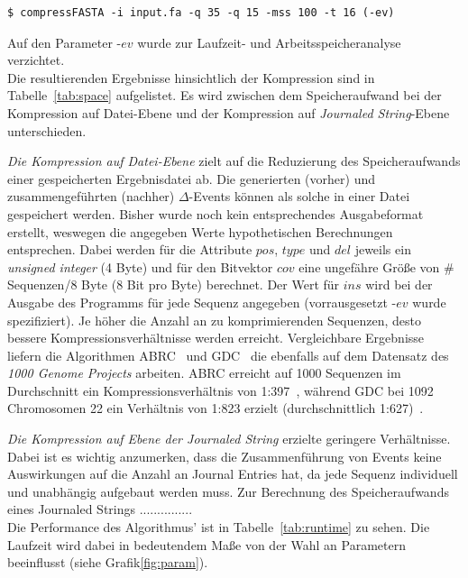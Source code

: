 \documentclass[12pt]{article}
\begin{document}
\begin{lstlisting}[style=BashInputStyle]
    $ compressFASTA -i input.fa -q 35 -q 15 -mss 100 -t 16 (-ev)
\end{lstlisting}

Auf den Parameter -$ev$ wurde zur Laufzeit- und Arbeitsspeicheranalyse verzichtet.\\

\noindent Die resultierenden Ergebnisse hinsichtlich der Kompression sind in Tabelle~\ref{tab:space} aufgelistet. Es wird zwischen dem Speicheraufwand bei der Kompression auf Datei-Ebene und der Kompression auf \textit{Journaled String}-Ebene unterschieden.

\emph{Die Kompression auf Datei-Ebene} zielt auf die Reduzierung des Speicheraufwands einer gespeicherten Ergebnisdatei ab. Die generierten (vorher) und zusammengeführten (nachher) $\Delta$-Events können als solche in einer Datei gespeichert werden. Bisher wurde noch kein entsprechendes Ausgabeformat erstellt, weswegen die angegeben Werte hypothetischen Berechnungen entsprechen. Dabei werden für die Attribute $pos$, $type$ und $del$ jeweils ein \textit{unsigned integer} (4 Byte) und für den Bitvektor $cov$ eine ungefähre Größe von $\#$Sequenzen/8 Byte (8 Bit pro Byte) berechnet. Der Wert für $ins$ wird bei der Ausgabe des Programms für jede Sequenz angegeben (vorrausgesetzt -$ev$ wurde spezifiziert). Je höher die Anzahl an zu komprimierenden Sequenzen, desto bessere Kompressionsverhältnisse werden erreicht. Vergleichbare Ergebnisse liefern die Algorithmen ABRC~\cite{wandelt:ABRC} und GDC~\cite{deoriwicz:GDC} die ebenfalls auf dem Datensatz des \textit{1000 Genome Projects} arbeiten. ABRC erreicht auf 1000 Sequenzen im Durchschnitt ein Kompressionsverhältnis von 1:397~\cite{wandelt:ABRC}, während GDC bei 1092 Chromosomen 22 ein Verhältnis von 1:823 erzielt (durchschnittlich 1:627)~\cite{deoriwicz:GDC2}.

\emph{Die Kompression auf Ebene der \textit{Journaled String}} erzielte geringere Verhältnisse. Dabei ist es wichtig anzumerken, dass die Zusammenführung von Events keine Auswirkungen auf die Anzahl an Journal Entries hat, da jede Sequenz individuell und unabhängig aufgebaut werden muss. Zur Berechnung des Speicheraufwands eines Journaled Strings ...............  \\

Die Performance des Algorithmus' ist in Tabelle~\ref{tab:runtime} zu sehen. Die Laufzeit wird dabei in bedeutendem Maße von der Wahl an Parametern beeinflusst (siehe Grafik\ref{fig:param}).
\end{document}
